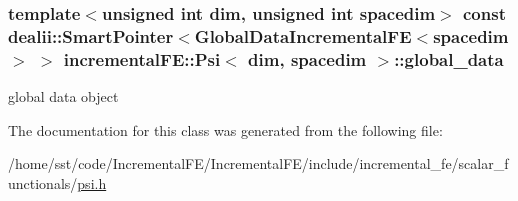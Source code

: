 \subsubsection[{\texorpdfstring{global\+\_\+data}{global_data}}]{\setlength{\rightskip}{0pt plus 5cm}template$<$unsigned int dim, unsigned int spacedim$>$ const dealii\+::\+Smart\+Pointer$<${\bf Global\+Data\+Incremental\+FE}$<$spacedim$>$ $>$ {\bf incremental\+F\+E\+::\+Psi}$<$ dim, spacedim $>$\+::global\+\_\+data\hspace{0.3cm}{\ttfamily [private]}}\hypertarget{classincremental_f_e_1_1_psi_ae77b2e13385734b19d6ee445c477a6eb}{}\label{classincremental_f_e_1_1_psi_ae77b2e13385734b19d6ee445c477a6eb}
global data object 

The documentation for this class was generated from the following file\+:\begin{DoxyCompactItemize}
\item 
/home/sst/code/\+Incremental\+F\+E/\+Incremental\+F\+E/include/incremental\+\_\+fe/scalar\+\_\+functionals/\hyperlink{psi_8h}{psi.\+h}\end{DoxyCompactItemize}
